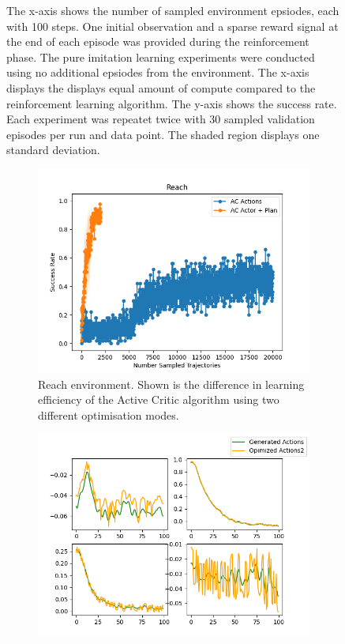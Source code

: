 \begin{figure}[htbp]
{    The x-axis shows the number of sampled environment epsiodes, each with 100 steps. One initial observation and a sparse reward signal at the end of each episode was provided 
    during the reinforcement phase. The pure imitation learning experiments were conducted using no additional epsiodes from the environment. The x-axis displays the 
    displays equal amount of compute compared to the reinforcement learning algorithm.
    The y-axis shows the success rate. Each experiment was repeatet twice with 
    30 sampled validation episodes per run and data point. The shaded region displays one standard deviation.}
    \label{fig:4}
\end{figure}

\begin{figure}[htbp]
    \centering
    \begin{subfigure}[t]{0.65\textwidth}
      \includegraphics[width=\textwidth]{images/Plan_vs_Actions/Reach.png}
      \caption{Reach environment. Shown is the difference in learning efficiency of the Active Critic algorithm using two different optimisation modes.}
      \label{fig:plot1}
    \end{subfigure}
    \medskip
    \begin{subfigure}[t]{0.45\textwidth}
      \includegraphics[width=\textwidth]{images/Plan_vs_Actions/changes/actions_1.png}

\end{subfigure}
\end{figure}
